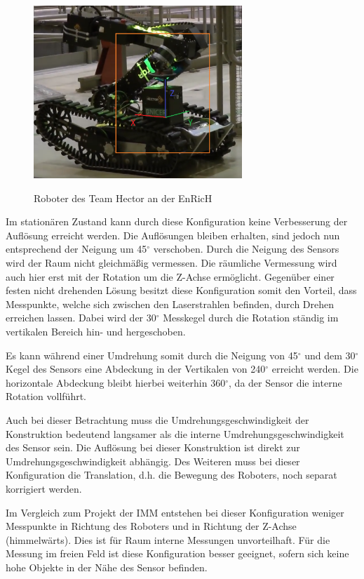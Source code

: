 \begin{figure}[H]
	\centering
	\includegraphics[width=0.7\textwidth]
	{resources/hector.PNG}
	\caption[Roboter des Team Hector EnRicH]{Roboter des Team Hector an der EnRicH} \protect\cite{hector}
	\label{fig:hector}
\end{figure}

Im stationären Zustand kann durch diese Konfiguration keine Verbesserung der Auflösung erreicht werden. Die Auflösungen bleiben erhalten, sind jedoch nun entsprechend der Neigung um 45$^\circ$ verschoben. Durch die Neigung des Sensors wird der Raum nicht gleichmäßig vermessen. Die räumliche Vermessung wird auch hier erst mit der Rotation um die Z-Achse ermöglicht. Gegenüber einer festen nicht drehenden Lösung besitzt diese Konfiguration somit den Vorteil, dass Messpunkte, welche sich zwischen den Laserstrahlen befinden, durch Drehen erreichen lassen. Dabei wird der 30$^\circ$ Messkegel durch die Rotation ständig im vertikalen Bereich hin- und hergeschoben.

Es kann während einer Umdrehung somit durch die Neigung von 45$^\circ$ und dem 30$^\circ$ Kegel des Sensors eine Abdeckung in der Vertikalen von 240$^\circ$ erreicht werden. Die horizontale Abdeckung bleibt hierbei weiterhin 360$^\circ$, da der Sensor die interne Rotation vollführt.

Auch bei dieser Betrachtung  muss die Umdrehungsgeschwindigkeit der Konstruktion bedeutend langsamer als die interne Umdrehungsgeschwindigkeit des Sensor sein. Die Auflösung bei dieser Konstruktion ist direkt zur Umdrehungsgeschwindigkeit abhängig. Des Weiteren muss bei dieser Konfiguration die Translation, d.h. die Bewegung des Roboters, noch separat korrigiert werden.  

Im Vergleich zum Projekt der IMM entstehen bei dieser Konfiguration weniger Messpunkte in Richtung des Roboters und in Richtung der Z-Achse (himmelwärts). Dies ist für Raum interne Messungen unvorteilhaft. Für die Messung im freien Feld ist diese Konfiguration besser geeignet, sofern sich keine hohe Objekte in der Nähe des Sensor befinden. 
 	
